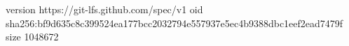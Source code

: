 version https://git-lfs.github.com/spec/v1
oid sha256:bf9d635c8c399524ea177bcc2032794e557937e5ec4b9388dbc1eef2ead7479f
size 1048672
